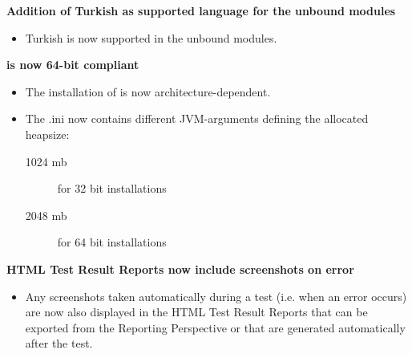 \textbf{Addition of Turkish as supported language for the unbound modules}
\begin{itemize}
\item Turkish is now supported in the unbound modules.
\end{itemize}

\textbf{\app{} is now 64-bit compliant}
\begin{itemize}
\item The installation of \app{} is now architecture-dependent.
\item The \app{}.ini now contains different JVM-arguments defining the allocated heapsize:
\begin{description}
\item [1024 mb]{for 32 bit installations}
\item [2048 mb]{for 64 bit installations}
\end{description}
\end{itemize}

\textbf{HTML Test Result Reports now include screenshots on error}
\begin{itemize}
\item Any screenshots taken automatically during a test (i.e. when an error occurs) are now also displayed in the HTML Test Result Reports that can be exported from the Reporting Perspective or that are generated automatically after the test. 
\end{itemize}
